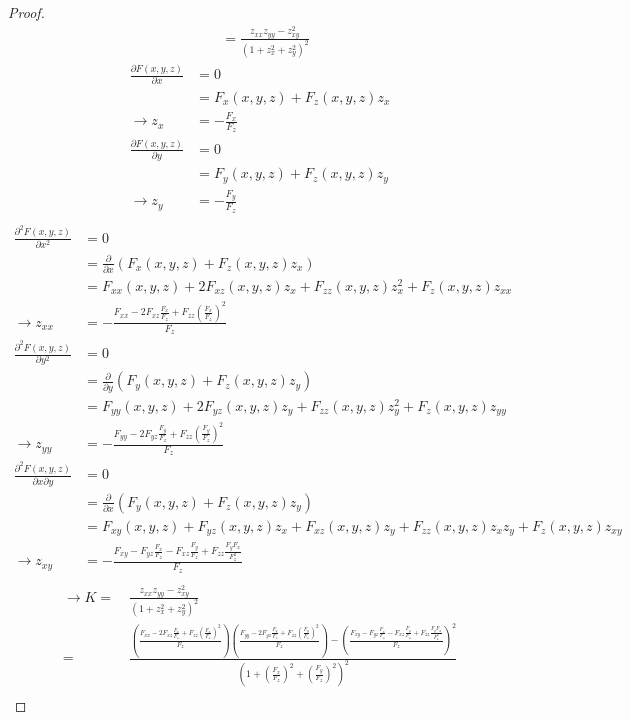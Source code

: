 \documentclass[10pt,a4paper]{article}
\begin{document}
\begin{proof}
\begin{align*}
&=\frac{z_{xx}z_{yy}-z_{xy}^2}{(1+z_x^2+z_y^2)^2}
\end{align*}
\begin{align*}
\frac{\partial F(x,y,z)}{\partial x}&=0\\ %
&=F_x(x,y,z)+F_z(x,y,z)z_x\\
\rightarrow z_x&=-\frac{F_x}{F_z}\\
\frac{\partial F(x,y,z)}{\partial y}&=0\\
&=F_y(x,y,z)+F_z(x,y,z)z_y\\
\rightarrow z_y&=-\frac{F_y}{F_z}\\
\end{align*}
\begin{align*}
\frac{\partial^2 F(x,y,z)}{\partial x^2}&=0\\
&=\frac{\partial}{\partial x}(F_x(x,y,z)+F_z(x,y,z)z_x)\\
&=F_{xx}(x,y,z)+2F_{xz}(x,y,z)z_x+F_{zz}(x,y,z)z_x^2+F_z(x,y,z)z_{xx}\\
\rightarrow z_{xx}&=-\frac{F_{xx}-2F_{xz}\frac{F_x}{F_z}+F_{zz}\left(\frac{F_x}{F_z}\right)^2}{F_z}\\
\frac{\partial^2 F(x,y,z)}{\partial y^2}&=0\\
&=\frac{\partial}{\partial y}(F_y(x,y,z)+F_z(x,y,z)z_y)\\
&=F_{yy}(x,y,z)+2F_{yz}(x,y,z)z_y+F_{zz}(x,y,z)z_y^2+F_z(x,y,z)z_{yy}\\
\rightarrow z_{yy}&=-\frac{F_{yy}-2F_{yz}\frac{F_y}{F_z}+F_{zz}\left(\frac{F_y}{F_z}\right)^2}{F_z}\\
\frac{\partial^2 F(x,y,z)}{\partial x\partial y}&=0\\
&=\frac{\partial}{\partial x}(F_y(x,y,z)+F_z(x,y,z)z_y)\\
&=F_{xy}(x,y,z)+F_{yz}(x,y,z)z_x+F_{xz}(x,y,z)z_y+F_{zz}(x,y,z)z_xz_y+F_z(x,y,z)z_{xy}\\
\rightarrow z_{xy}&=-\frac{F_{xy}-F_{yz}\frac{F_x}{F_z}-F_{xz}\frac{F_y}{F_z}+F_{zz}\frac{F_yF_x}{F_z^2}}{F_z}\\
\end{align*}
\begin{align*}
\rightarrow K=&\ \frac{z_{xx}z_{yy}-z_{xy}^2}{(1+z_x^2+z_y^2)^2}\\
=&\ \frac{\left(\frac{F_{xx}-2F_{xz}\frac{F_x}{F_z}+F_{zz}\left(\frac{F_x}{F_z}\right)^2}{F_z}\right)\left(\frac{F_{yy}-2F_{yz}\frac{F_y}{F_z}+F_{zz}\left(\frac{F_y}{F_z}\right)^2}{F_z}\right)-\left(\frac{F_{xy}-F_{yz}\frac{F_x}{F_z}-F_{xz}\frac{F_y}{F_z}+F_{zz}\frac{F_yF_x}{F_z^2}}{F_z}\right)^2}{(1+\left(\frac{F_x}{F_z}\right)^2+\left(\frac{F_y}{F_z}\right)^2)^2}\\

\end{align*}
\end{proof}
\end{document}

